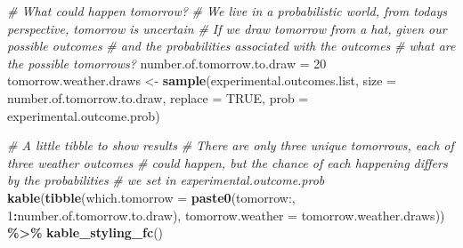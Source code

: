 \documentclass[
]{book}
\newenvironment{Shaded}{\begin{snugshade}}{\end{snugshade}}
\newcommand{\CommentTok}[1]{\textcolor[rgb]{0.56,0.35,0.01}{\textit{#1}}}
\newcommand{\DataTypeTok}[1]{\textcolor[rgb]{0.13,0.29,0.53}{#1}}
\newcommand{\DecValTok}[1]{\textcolor[rgb]{0.00,0.00,0.81}{#1}}
\newcommand{\KeywordTok}[1]{\textcolor[rgb]{0.13,0.29,0.53}{\textbf{#1}}}
\newcommand{\NormalTok}[1]{#1}
\newcommand{\OperatorTok}[1]{\textcolor[rgb]{0.81,0.36,0.00}{\textbf{#1}}}
\newcommand{\OtherTok}[1]{\textcolor[rgb]{0.56,0.35,0.01}{#1}}
\newcommand{\StringTok}[1]{\textcolor[rgb]{0.31,0.60,0.02}{#1}}
\begin{document}
\begin{Shaded}
\begin{Highlighting}[]
\CommentTok{\# What could happen tomorrow?}
\CommentTok{\# We live in a probabilistic world, from today\textquotesingle{}s perspective, tomorrow is uncertain}
\CommentTok{\# If we draw tomorrow from a hat, given our possible outcomes}
\CommentTok{\# and the probabilities associated with the outcomes}
\CommentTok{\# what are the possible tomorrows?}
\NormalTok{number.of.tomorrow.to.draw =}\StringTok{ }\DecValTok{20}
\NormalTok{tomorrow.weather.draws \textless{}{-}}\StringTok{ }\KeywordTok{sample}\NormalTok{(experimental.outcomes.list,}
                                 \DataTypeTok{size =}\NormalTok{ number.of.tomorrow.to.draw,}
                                 \DataTypeTok{replace =} \OtherTok{TRUE}\NormalTok{,}
                                 \DataTypeTok{prob =}\NormalTok{ experimental.outcome.prob)}

\CommentTok{\# A little tibble to show results}
\CommentTok{\# There are only three unique tomorrows, each of three weather outcomes}
\CommentTok{\# could happen, but the chance of each happening differs by the probabilities}
\CommentTok{\# we set in experimental.outcome.prob}
\KeywordTok{kable}\NormalTok{(}\KeywordTok{tibble}\NormalTok{(}\DataTypeTok{which.tomorrow =} \KeywordTok{paste0}\NormalTok{(}\StringTok{\textquotesingle{}tomorrow:\textquotesingle{}}\NormalTok{, }\DecValTok{1}\OperatorTok{:}\NormalTok{number.of.tomorrow.to.draw),}
       \DataTypeTok{tomorrow.weather =}\NormalTok{ tomorrow.weather.draws)) }\OperatorTok{\%\textgreater{}\%}\StringTok{ }\KeywordTok{kable\_styling\_fc}\NormalTok{()}
\end{Highlighting}
\end{Shaded}
\end{document}
